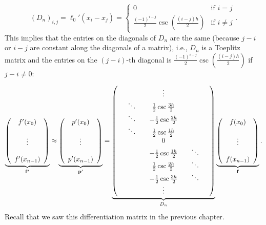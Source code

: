 \documentclass[12pt,landscape]{article}
\begin{document}
{\[
\left(D_n \right)_{i,j} = \ell_{0}'(x_i-x_j) = \begin{cases}
 0 & \text{if } i = j \\
 \frac{(-1)^{i-j}}{2}\csc\left( \frac{(i-j)h}{2} \right)  & \text{if } i\neq j
\end{cases}.
\]
This implies that the entries on the diagonals of $D_n$ are the same (because $j - i$ or $i-j$ are constant along the diagonals of a matrix), i.e., $D_n$ is a Toeplitz matrix  and the entries  on the $(j-i)$-th diagonal is $\frac{(-1)^{i-j}}{2}\csc\left( \frac{(i-j)h}{2} \right)$ if $j - i \neq 0$:

\[
\underbrace{\left(
\begin{array}{c}
f'(x_0) \\
  \\
\vdots  \\
  \\
f'(x_{n-1})
\end{array}
\right)}_{\mathbf{f}'} \approx 
\underbrace{\left(
\begin{array}{c}
p'(x_0) \\
  \\
\vdots  \\
  \\
p'(x_{n-1})
\end{array}
\right)}_{\mathbf{p}'} = 
\underbrace{\left(
\begin{array}{c c c c c c c}
  &       &       & \vdots  &   &   & \\
  &\ddots &       & \frac{1}{2}\csc \frac{3h}{2}   &   &    &  \\
   &\ddots &      &-\frac{1}{2}\csc \frac{2h}{2}   &   &    &  \\ 
   &\ddots &      & \frac{1}{2}\csc \frac{1h}{2}   &   &    &   \\
  &        &      & 0                              &   &    &   \\
&      &      & -\frac{1}{2}\csc \frac{1h}{2}   &   &   \ddots &  \\
&      &      & \frac{1}{2}\csc \frac{2h}{2}   &   &   \ddots &  \\
&      &      & -\frac{1}{2}\csc \frac{3h}{2}   &   &   \ddots &  \\
&      &      & \vdots  &   &    &  \\
\end{array}
\right)}_{D_n}
\underbrace{\left(
\begin{array}{c}
f(x_0) \\
  \\
\vdots  \\
  \\
f(x_{n-1})
\end{array}
\right)}_{\mathbf{f}}.
\]
Recall that we saw this differentiation matrix in the previous chapter.

}
\end{document}
